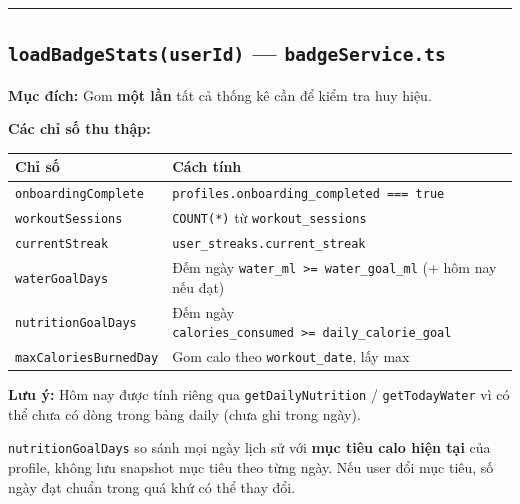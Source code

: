 \documentclass[12pt,a4paper]{article}
\newcounter{none}
\begin{document}
\begin{center}\rule{0.5\linewidth}{0.5pt}\end{center}

\subsection{\texorpdfstring{\texttt{loadBadgeStats(userId)} ---
\texttt{badgeService.ts}}{loadBadgeStats(userId) --- badgeService.ts}}\label{loadbadgestatsuserid-badgeservice.ts}

\textbf{Mục đích:} Gom \textbf{một lần} tất cả thống kê cần để kiểm tra
huy hiệu.

\textbf{Các chỉ số thu thập:}

{\def\LTcaptype{none} %
\begin{longtable}[]{@{}
  >{\raggedright\arraybackslash}p{}
  >{\raggedright\arraybackslash}p{}@{}}
\toprule\noalign{}
\begin{minipage}[b]{\linewidth}\raggedright
Chỉ số
\end{minipage} & \begin{minipage}[b]{\linewidth}\raggedright
Cách tính
\end{minipage} \\
\midrule\noalign{}
\endhead
\bottomrule\noalign{}
\endlastfoot
\texttt{onboardingComplete} &
\texttt{profiles.onboarding\_completed\ ===\ true} \\
\texttt{workoutSessions} & \texttt{COUNT(*)} từ
\texttt{workout\_sessions} \\
\texttt{currentStreak} & \texttt{user\_streaks.current\_streak} \\
\texttt{waterGoalDays} & Đếm ngày
\texttt{water\_ml\ \textgreater{}=\ water\_goal\_ml} (+ hôm nay nếu
đạt) \\
\texttt{nutritionGoalDays} & Đếm ngày
\texttt{calories\_consumed\ \textgreater{}=\ daily\_calorie\_goal} \\
\texttt{maxCaloriesBurnedDay} & Gom calo theo \texttt{workout\_date},
lấy max \\
\end{longtable}
}

\textbf{Lưu ý:} Hôm nay được tính riêng qua \texttt{getDailyNutrition} /
\texttt{getTodayWater} vì có thể chưa có dòng trong bảng daily (chưa ghi
trong ngày).

\texttt{nutritionGoalDays} so sánh mọi ngày lịch sử với \textbf{mục tiêu
calo hiện tại} của profile, không lưu snapshot mục tiêu theo từng ngày.
Nếu user đổi mục tiêu, số ngày đạt chuẩn trong quá khứ có thể thay đổi.
\end{document}
